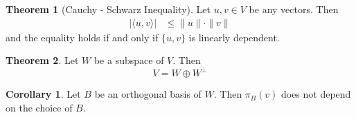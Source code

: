 \documentclass[fleqn, a5paper, 10pt]{amsart}
\theoremstyle{definition}
\theoremstyle{theorem}
\newtheorem{theorem}{Theorem} %
\newtheorem{corollary}{Corollary}
\theoremstyle{remark}
\numberwithin{corollary}{theorem}
\numberwithin{equation}{theorem}
\begin{document}
\begin{theorem}[Cauchy - Schwarz Inequality]\label{Cauchy - Schwarz Inequality}
	Let $u, v \in V$ be any vectors. Then
	\begin{align*}
		| \langle u, v \rangle | &\leq \| u \| \cdot \| v \|
	\end{align*}
	and the equality holds if and only if $\{u, v\}$ is linearly dependent.
\end{theorem}

\begin{theorem}
	Let $W$ be a subspace of $V$. Then
	\begin{equation*}
		V = W \oplus W^{\perp}
	\end{equation*}
\end{theorem}

\begin{corollary}
	Let $B$ be an orthogonal basis of $W$. Then $\pi_B(v)$ does not depend on the choice of $B$.
\end{corollary}
\end{document}
